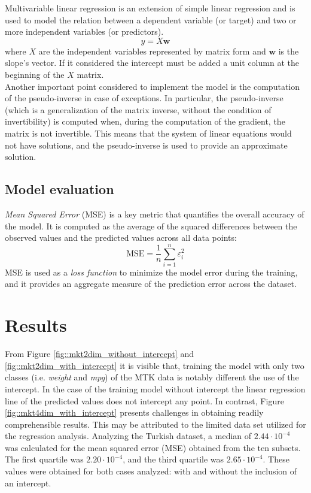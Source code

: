 \documentclass[9pt,technote]{IEEEtran}
\begin{document}
	Multivariable linear regression is an extension of simple linear regression and is used to model the relation between a dependent variable (or target) and two or more independent variables (or predictors).
	\begin{equation}
		y = X \mathbf w
	\end{equation}
	where $X$ are the independent variables represented by matrix form and $\mathbf w$ is the slope's vector. If it considered the intercept must be added a unit column at the beginning of the $X$ matrix. \\
	Another important point considered to implement the model is the computation of the pseudo-inverse in case of exceptions. In particular, the pseudo-inverse (which is a generalization of the matrix inverse, without the condition of invertibility) is computed when, during the computation of the gradient, the matrix is not invertible. This means that the system of linear equations would not have solutions, and the pseudo-inverse is used to provide an approximate solution.
	\subsection{Model evaluation}
	\textit{Mean Squared Error} (MSE) is a key metric that quantifies the overall accuracy of the model. It is computed as the average of the squared differences between the observed values and the predicted values across all data points:
	\begin{equation}
		\text{MSE} = \frac{1}{n} \sum_{i=1}^{n} \varepsilon_i^2
	\end{equation}
	MSE is used as a \textit{loss function} to minimize the model error during the training, and it provides an aggregate measure of the prediction error across the dataset.
	
	\section{Results}
	From Figure \ref{fig::mkt2dim_without_intercept} and \ref{fig::mkt2dim_with_intercept} it is visible that, training the model with only two classes (i.e. \textit{weight} and \textit{mpg}) of the MTK data is notably different the use of the intercept. In the case of the training model without intercept the linear regression line of the predicted values does not intercept any point.
	In contrast, Figure \ref{fig::mkt4dim_with_intercept} presents challenges in obtaining readily comprehensible results. This may be attributed to the limited data set utilized for the regression analysis.
	 Analyzing the Turkish dataset, a median of $2.44 \cdot 10^{-4}$ was calculated for the mean squared error (MSE) obtained from the ten subsets. The first quartile was $2.20 \cdot 10^{-4}$, and the third quartile was $2.65 \cdot 10^{-4}$. These values were obtained for both cases analyzed: with and without the inclusion of an intercept.
	 		
\end{document}

